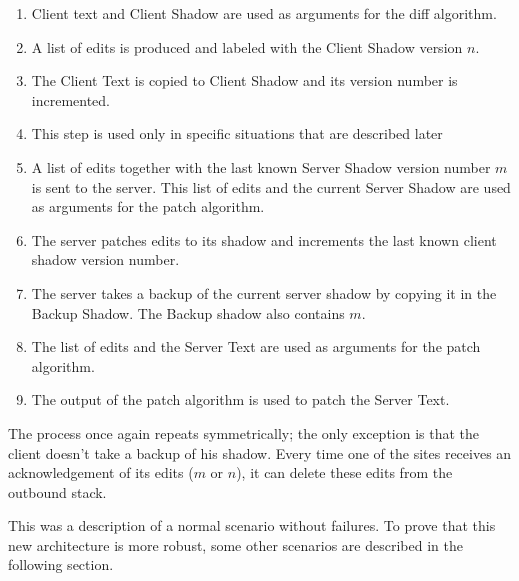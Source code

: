\documentclass[12pt,oneside]{fithesis2}
\begin{document}
\begin{enumerate}
\item Client text and Client Shadow are used as arguments for the diff algorithm.
\item A list of edits is produced and labeled with the Client Shadow version \(n\).
\item The Client Text is copied to Client Shadow and its version number is incremented.
\item This step is used only in specific situations that are described later
\item A list of edits together with the last known Server Shadow version number \(m\) is sent to the server. This list of edits and the current Server Shadow are used as arguments for the patch algorithm. 
\item The server patches edits to its shadow and increments the last known client shadow version number.
\item The server takes a backup of the current server shadow by copying it in the Backup Shadow. The Backup shadow also contains \(m\).
\item The list of edits and the Server Text are used as arguments for the patch algorithm.
\item The output of the patch algorithm is used to patch the Server Text.
\end{enumerate}
\par The process once again repeats symmetrically; the only exception is that the client doesn't take a backup of his shadow. Every time one of the sites receives an acknowledgement of its edits (\(m\) or \(n\)), it can delete these edits from the outbound stack.
\par This was a description of a normal scenario without failures. To prove that this new architecture is more robust, some other scenarios are described in the following section.
\end{document}
